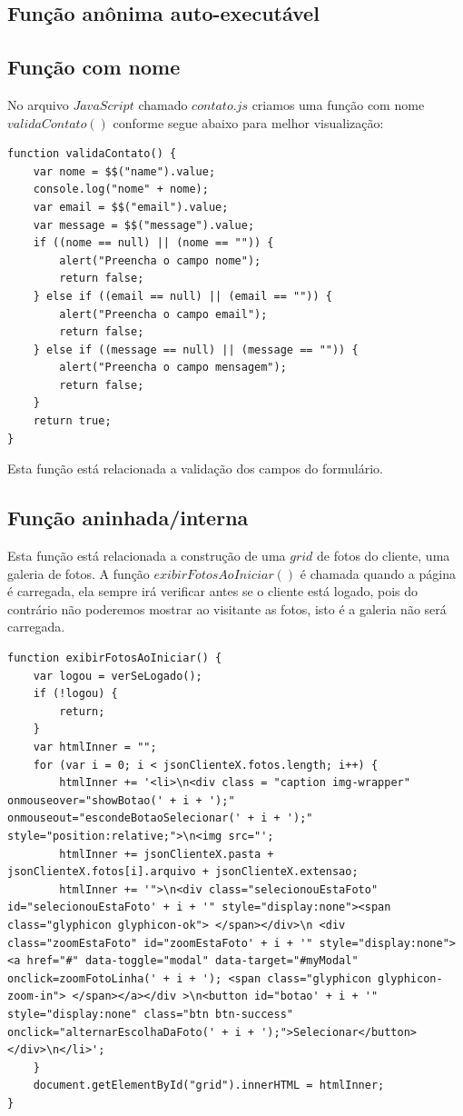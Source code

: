\subsection{Função anônima auto-executável}

\subsection{Função com nome}

	No arquivo $JavaScript$ chamado $contato.js$ criamos uma função com nome $validaContato()$ conforme segue abaixo para melhor visualização:
\begin{lstlisting}
function validaContato() {
    var nome = $$("name").value;
    console.log("nome" + nome);
    var email = $$("email").value;
    var message = $$("message").value;
    if ((nome == null) || (nome == "")) {
        alert("Preencha o campo nome");
        return false;
    } else if ((email == null) || (email == "")) {
        alert("Preencha o campo email");
        return false;
    } else if ((message == null) || (message == "")) {
        alert("Preencha o campo mensagem");
        return false;
    }
    return true;
}
\end{lstlisting}
	Esta função está relacionada a validação dos campos do formulário.

\subsection{Função aninhada/interna}

	Esta função está relacionada a construção de uma $grid$ de fotos do cliente, uma galeria de fotos. A função  $exibirFotosAoIniciar()$ é chamada quando a página é carregada, ela sempre irá  verificar antes se o cliente está logado, pois do contrário não poderemos mostrar ao visitante as fotos, isto é a galeria não será carregada. 
	
\begin{lstlisting}
function exibirFotosAoIniciar() {
    var logou = verSeLogado();
    if (!logou) {
        return;
    }
    var htmlInner = "";
    for (var i = 0; i < jsonClienteX.fotos.length; i++) {
        htmlInner += '<li>\n<div class = "caption img-wrapper" onmouseover="showBotao(' + i + ');" onmouseout="escondeBotaoSelecionar(' + i + ');" style="position:relative;">\n<img src="';
        htmlInner += jsonClienteX.pasta + jsonClienteX.fotos[i].arquivo + jsonClienteX.extensao;
        htmlInner += '">\n<div class="selecionouEstaFoto" id="selecionouEstaFoto' + i + '" style="display:none"><span class="glyphicon glyphicon-ok"> </span></div>\n <div class="zoomEstaFoto" id="zoomEstaFoto' + i + '" style="display:none"><a href="#" data-toggle="modal" data-target="#myModal" onclick=zoomFotoLinha(' + i + '); <span class="glyphicon glyphicon-zoom-in"> </span></a></div >\n<button id="botao' + i + '" style="display:none" class="btn btn-success" onclick="alternarEscolhaDaFoto(' + i + ');">Selecionar</button></div>\n</li>';
    }
    document.getElementById("grid").innerHTML = htmlInner;
}
\end{lstlisting}


